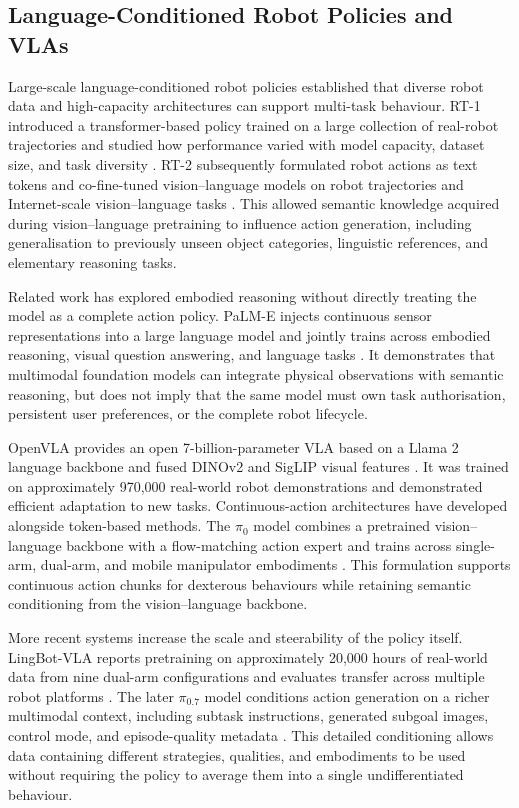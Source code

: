 \documentclass{article}
\begin{document}
\subsection{Language-Conditioned Robot Policies and VLAs}
\label{subsec:related-vla}

Large-scale language-conditioned robot policies established that diverse
robot data and high-capacity architectures can support multi-task behaviour.
RT-1 introduced a transformer-based policy trained on a large collection of
real-robot trajectories and studied how performance varied with model
capacity, dataset size, and task diversity
\parencite{brohan2022rt1}. RT-2 subsequently formulated robot actions as text
tokens and co-fine-tuned vision--language models on robot trajectories and
Internet-scale vision--language tasks
\parencite{brohan2023rt2}. This allowed semantic knowledge acquired during
vision--language pretraining to influence action generation, including
generalisation to previously unseen object categories, linguistic references,
and elementary reasoning tasks.

Related work has explored embodied reasoning without directly treating the
model as a complete action policy. PaLM-E injects continuous sensor
representations into a large language model and jointly trains across embodied
reasoning, visual question answering, and language tasks
\parencite{driess2023palme}. It demonstrates that multimodal foundation models
can integrate physical observations with semantic reasoning, but does not
imply that the same model must own task authorisation, persistent user
preferences, or the complete robot lifecycle.

OpenVLA provides an open 7-billion-parameter VLA based on a Llama 2 language
backbone and fused DINOv2 and SigLIP visual features
\parencite{kim2024openvla}. It was trained on approximately 970,000 real-world
robot demonstrations and demonstrated efficient adaptation to new tasks.
Continuous-action architectures have developed alongside token-based methods.
The \(\pi_0\) model combines a pretrained vision--language backbone with a
flow-matching action expert and trains across single-arm, dual-arm, and mobile
manipulator embodiments \parencite{black2025pi0}. This formulation supports
continuous action chunks for dexterous behaviours while retaining semantic
conditioning from the vision--language backbone.

More recent systems increase the scale and steerability of the policy itself.
LingBot-VLA reports pretraining on approximately 20,000 hours of real-world
data from nine dual-arm configurations and evaluates transfer across multiple
robot platforms \parencite{wu2026pragmaticvla}. The later
\(\pi_{0.7}\) model conditions action generation on a richer multimodal
context, including subtask instructions, generated subgoal images, control
mode, and episode-quality metadata
\parencite{physicalintelligence2026pi07}. This detailed conditioning allows
data containing different strategies, qualities, and embodiments to be used
without requiring the policy to average them into a single undifferentiated
behaviour.
\end{document}
